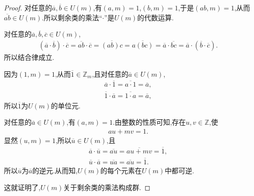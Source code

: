 \documentclass[../../main.tex]{subfiles}%
\begin{document}
\begin{proof}
对任意的$\overline{a},\overline{b} \in U(m)$,有$(a,m)=1$,$(b,m)=1$,于是$(ab,m)=1$,从而$\overline{ab} \in U(m)$.所以剩余类的乘法“$\cdot$”是$U(m)$的代数运算.

对任意的$\overline{a},\overline{b},\overline{c} \in U(m)$,
\begin{align*}
(\overline{a} \cdot \overline{b}) \cdot \overline{c} = \overline{ab} \cdot \overline{c} = \overline{(ab)c} = \overline{a(bc)} = \overline{a} \cdot \overline{bc} = \overline{a} \cdot (\overline{b} \cdot \overline{c}).
\end{align*}
所以结合律成立.

因为$(1,m)=1$,从而$\overline{1} \in \mathbb{Z}_m$,且对任意的$\overline{a} \in U(m)$,
\begin{align*}
\overline{a} \cdot \overline{1} = \overline{a \cdot 1} = \overline{a}, \\
\overline{1} \cdot \overline{a} = \overline{1 \cdot a} = \overline{a},
\end{align*}
所以$\overline{1}$为$U(m)$的单位元.

对任意的$\overline{a} \in U(m)$,有$(a,m)=1$.由整数的性质可知,存在$u,v \in \mathbb{Z}$,使
\begin{align*}
au + mv = 1.
\end{align*}
显然$(u,m)=1$,所以$\overline{u} \in U(m)$,且
\begin{gather*}
\overline{a}\cdot \overline{u}=\overline{au}=\overline{au+mv}=\overline{1},
\\
\overline{u}\cdot \overline{a}=\overline{ua}=\overline{au}=\overline{1}.
\end{gather*}
所以$\overline{u}$为$\overline{a}$的逆元.从而知,$U(m)$的每个元素在$U(m)$中都可逆.

这就证明了,$U(m)$关于剩余类的乘法构成群.
\end{proof}
\end{document}
